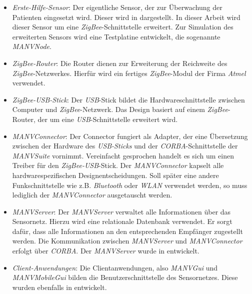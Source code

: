 \begin{itemize}
    \item{\emph{Erste-Hilfe-Sensor}:} Der eigentliche Sensor, der zur Überwachung der Patienten eingesetzt wird. Dieser 
                               wird in \cite{Marc} dargestellt. In dieser Arbeit wird dieser Sensor um eine 
                               \emph{ZigBee}-Schnittstelle erweitert. Zur Simulation des erweiterten Sensors
                               wird eine Testplatine entwickelt, die sogenannte \emph{MANVNode}.
    \item{\emph{ZigBee-Router}:} Die Router dienen zur Erweiterung der Reichweite des \emph{ZigBee}-Netzwerkes.
                                 Hierfür wird ein fertiges \emph{ZigBee}-Modul der Firma \emph{Atmel} verwendet.
    \item{\emph{ZigBee-USB-Stick}:} Der \emph{USB}-Stick bildet die Hardwareschnittstelle zwischen Computer und 
                                    \emph{ZigBee}-Netzwerk. Das Design basiert auf einem \emph{ZigBee}-Router,
                                    der um eine \emph{USB}-Schnittstelle erweitert wird.
    \item{\emph{MANVConnector}:} Der Connector fungiert als Adapter, der eine Übersetzung zwischen der 
                                 Hardware des \emph{USB-Sticks} und der \emph{CORBA}-Schnittstelle der \emph{MANVSuite}
                                 vornimmt. Vereinfacht gesprochen handelt es sich um einen Treiber für den 
                                 \emph{ZigBee-USB}-Stick. Der \emph{MANVConnector} kapselt alle hardwarespezifischen
                                 Designentscheidungen. Soll später eine andere Funkschnittstelle wie z.B.
                                 \emph{Bluetooth} oder \emph{WLAN} verwendet werden, so muss lediglich
                                 der \emph{MANVConnector} ausgetauscht werden.
    \item{\emph{MANVServer}:} Der \emph{MANVServer} verwaltet alle Informationen über das Sensornetz. Hierzu
                              wird eine relationale Datenbank verwendet. Er sorgt dafür, dass alle Informationen
                              an den entsprechenden Empfänger zugestellt werden. Die Kommunikation zwischen
                              \emph{MANVServer} und \emph{MANVConnector} erfolgt über \emph{CORBA}. Der 
                              \emph{MANVServer} wurde in \cite{Jan} entwickelt.
    \item{\emph{Client-Anwendungen}:} Die Clientanwendungen, also \emph{MANVGui} und \emph{MANVMobileGui} bilden
                                      die Benutzerschnittstelle des Sensornetzes. Diese wurden ebenfalls
                                      in \cite{Jan} entwickelt. 
\end{itemize}
    

